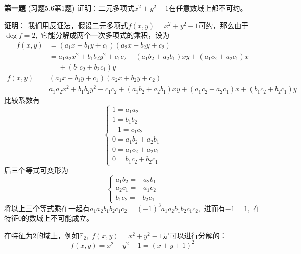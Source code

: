 
\date{2022-12-16 第八次习题课}
\author{}



\maketitle

\ifLargeLayout
\larger[2]
\fi

{\bf 第一题} (习题5.6第1题) 证明：二元多项式$x^2 + y^2 - 1$在任意数域上都不可约。

\ifIncludeAnswer

\newpageorvspace

{\bf 证明}： 我们用反证法，假设二元多项式$f(x, y) = x^2 + y^2 - 1$可约，那么由于$\deg f = 2,$ 它能分解成两个一次多项式的乘积，设为
\ifLargeLayout
\begin{align*}
f(x, y) & = (a_1x + b_1y + c_1)(a_2x + b_2y + c_2) \\
& = a_1a_2 x^2 + b_1b_2 y^2 + c_1c_2 + (a_1b_2 + a_2b_1) xy + (a_1c_2 + a_2c_1)x \\
& \phantom{=} + (b_1c_2 + b_2c_1)y
\end{align*}
\else  %
\begin{align*}
f(x, y) & = (a_1x + b_1y + c_1)(a_2x + b_2y + c_2) \\
& = a_1a_2 x^2 + b_1b_2 y^2 + c_1c_2 + (a_1b_2 + a_2b_1) xy + (a_1c_2 + a_2c_1)x + (b_1c_2 + b_2c_1)y
\end{align*}
\fi  %
比较系数有
$$
\begin{cases}
1 = a_1a_2 \\
1 = b_1b_2 \\
-1 = c_1c_2 \\
0 = a_1b_2 + a_2b_1 \\
0 = a_1c_2 + a_2c_1 \\
0 = b_1c_2 + b_2c_1
\end{cases}
$$
后三个等式可变形为
$$
\begin{cases}
a_1b_2 = - a_2b_1 \\
a_2c_1 = - a_1c_2 \\
b_1c_2 = - b_2c_1
\end{cases}
$$
将以上三个等式乘在一起有$a_1a_2b_1b_2c_1c_2 = (-1)^3 a_1a_2b_1b_2c_1c_2,$ 进而有$-1 = 1,$ 在特征0的数域上不可能成立。

\vspace{0.5em}

在特征为2的域上，例如$\mathbb{F}_2,$ $f(x, y) = x^2 + y^2 - 1$是可以进行分解的：
$$f(x, y) = x^2 + y^2 - 1 = (x + y + 1)^2$$

